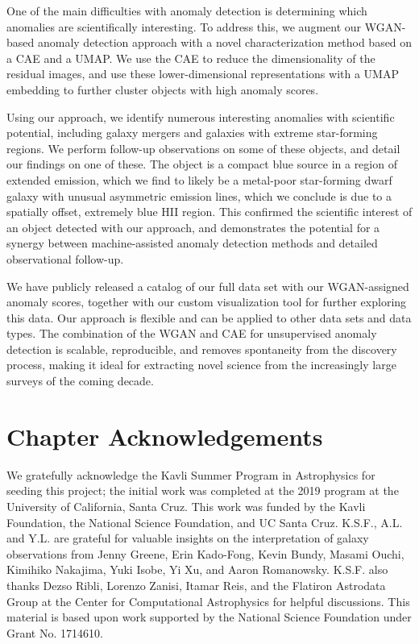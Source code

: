 One of the main difficulties with anomaly detection is determining which anomalies are scientifically interesting.
To address this, we augment our WGAN-based anomaly detection approach with a novel characterization method based on a CAE and a UMAP.
We use the CAE to reduce the dimensionality of the residual images, and use these lower-dimensional representations with a UMAP embedding to further cluster objects with high anomaly scores.

Using our approach, we identify numerous interesting anomalies with scientific potential, including galaxy mergers and galaxies with extreme star-forming regions.
We perform follow-up observations on some of these objects, and detail our findings on one of these.
The object is a compact blue source in a region of extended emission, which we find to likely be a metal-poor star-forming dwarf galaxy with unusual asymmetric emission lines, which we conclude is due to a spatially offset, extremely blue HII region.
This confirmed the scientific interest of an object detected with our approach, and demonstrates the potential for a synergy between machine-assisted anomaly detection methods and detailed observational follow-up.

We have publicly released a catalog of our full data set with our WGAN-assigned anomaly scores, together with our custom visualization tool for further exploring this data.
Our approach is flexible and can be applied to other data sets and data types.
The combination of the WGAN and CAE for unsupervised anomaly detection is scalable, reproducible, and removes spontaneity from the discovery process, making it ideal for extracting novel science from the increasingly large surveys of the coming decade.

\section{Chapter Acknowledgements}

We gratefully acknowledge the Kavli Summer Program in Astrophysics for seeding this project; the initial work was completed at the 2019 program at the University of California, Santa Cruz.
This work was funded by the Kavli Foundation, the National Science Foundation, and UC Santa Cruz.
K.S.F., A.L. and Y.L. are grateful for valuable insights on the interpretation of galaxy observations from Jenny Greene, Erin Kado-Fong, Kevin Bundy, Masami Ouchi, Kimihiko Nakajima, Yuki Isobe, Yi Xu, and Aaron Romanowsky.
K.S.F. also thanks Dezso Ribli, Lorenzo Zanisi, Itamar Reis, and the Flatiron Astrodata Group at the Center for Computational Astrophysics for helpful discussions. 
This material is based upon work supported by the National Science Foundation under Grant No. 1714610.

